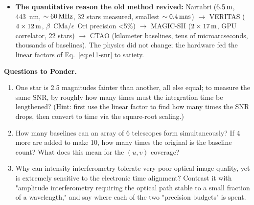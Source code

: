 \begin{itemize}
  \item \textbf{The quantitative reason the old method revived:} Narrabri (\(6.5\,{\rm m}\), 443~nm, \(\sim60\,{\rm MHz}\), 32 stars measured, smallest \(\sim0.4\,{\rm mas}\)) \(\to\) VERITAS (\(4\times12\,{\rm m}\), \(\beta\)~CMa/\(\epsilon\)~Ori precision <5\%) \(\to\) MAGIC-SII (\(2\times17\,{\rm m}\), GPU correlator, 22 stars) \(\to\) CTAO (kilometer baselines, tens of microarcseconds, thousands of baselines). The physics did not change; the hardware fed the linear factors of Eq.~\eqref{eq:e11-snr} to satiety.
\end{itemize}

\medskip
\noindent\textbf{Questions to Ponder.}
\begin{enumerate}
  \item One star is 2.5 magnitudes fainter than another, all else equal; to measure the same SNR, by roughly how many times must the integration time be lengthened? (Hint: first use the linear factor to find how many times the SNR drops, then convert to time via the square-root scaling.)
  \item How many baselines can an array of 6 telescopes form simultaneously? If 4 more are added to make 10, how many times the original is the baseline count? What does this mean for the \((u,v)\) coverage?
  \item Why can intensity interferometry tolerate very poor optical image quality, yet is extremely sensitive to the electronic time alignment? Contrast it with "amplitude interferometry requiring the optical path stable to a small fraction of a wavelength," and say where each of the two "precision budgets" is spent.
\end{enumerate}
